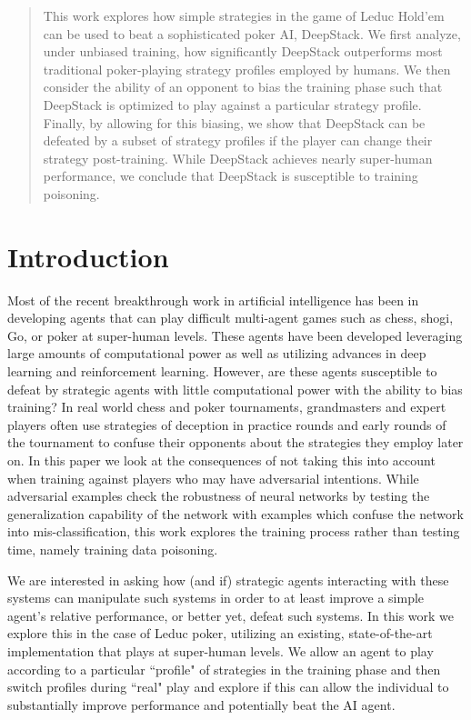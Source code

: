 \documentclass{article}
\begin{document}
\begin{abstract}
This work explores how simple strategies in the game of Leduc Hold'em can be used to beat a sophisticated poker AI, DeepStack. We first analyze, under unbiased training, how significantly DeepStack outperforms most traditional poker-playing strategy profiles employed by humans. We then consider the ability of an opponent to bias the training phase such that DeepStack is optimized to play against a particular strategy profile. Finally, by allowing for this biasing, we show that DeepStack can be defeated by a subset of strategy profiles if the player can change their strategy post-training. While DeepStack achieves nearly super-human performance, we conclude that DeepStack is susceptible to training poisoning.
\end{abstract}

\section{Introduction}
\label{Introduction}

Most of the recent breakthrough work in artificial intelligence has been in developing agents that can play difficult multi-agent games such as chess, shogi, Go, or poker at super-human levels. These agents have been developed leveraging large amounts of computational power as well as utilizing advances in deep learning and reinforcement learning. However, are these agents susceptible to defeat by strategic agents with little computational power with the ability to bias training? In real world chess and poker tournaments, grandmasters and expert players often use strategies of deception in practice rounds and early rounds of the tournament to confuse their opponents about the strategies they employ later on. In this paper we look at the consequences of not taking this into account when training against players who may have adversarial intentions. While adversarial examples check the robustness of neural networks by testing the generalization capability of the network with examples which confuse the network into mis-classification, this work explores the training process rather than testing time, namely training data poisoning. 

We are interested in asking how (and if) strategic agents interacting with these systems can manipulate such systems in order to at least improve a simple agent's relative performance, or better yet, defeat such systems. In this work we explore this in the case of Leduc poker, utilizing an existing, state-of-the-art implementation that plays at super-human levels. 
We allow an agent to play according to a particular ``profile" of strategies in the training phase and then switch profiles during ``real" play and explore if this can allow the individual to substantially improve performance and potentially beat the AI agent.
\end{document}
